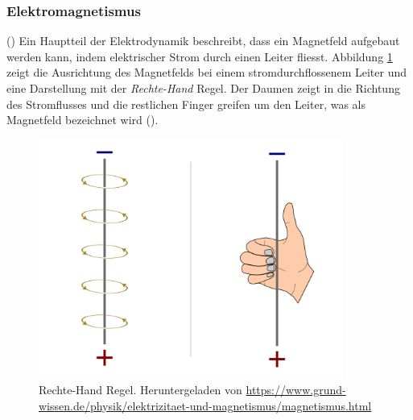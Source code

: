 \subsubsection{Elektromagnetismus}
(\cite{ChemgarooMagnetfelder})
\newpara
Ein Hauptteil der Elektrodynamik beschreibt, dass ein Magnetfeld aufgebaut werden kann, indem elektrischer Strom durch einen Leiter fliesst. Abbildung \ref{fig:rechte_hand_regel} zeigt die Ausrichtung des Magnetfelds bei einem stromdurchflossenem Leiter und eine Darstellung mit der \textit{Rechte-Hand} Regel. Der Daumen zeigt in die Richtung des Stromflusses und die restlichen Finger greifen um den Leiter, was als Magnetfeld bezeichnet wird (\cite{schulmaterial_magnetismus}).

\begin{figure}[ht]
    \begin{center}
      \includegraphics[width=10cm]{assets/images/magnetismus/magnetfeld-leiter-rechte-hand-regel}
    \end{center}
    \vspace{-3ex}
    \caption{Rechte-Hand Regel. Heruntergeladen von \url{https://www.grund-wissen.de/physik/elektrizitaet-und-magnetismus/magnetismus.html}}
    \label{fig:rechte_hand_regel}
\end{figure}

